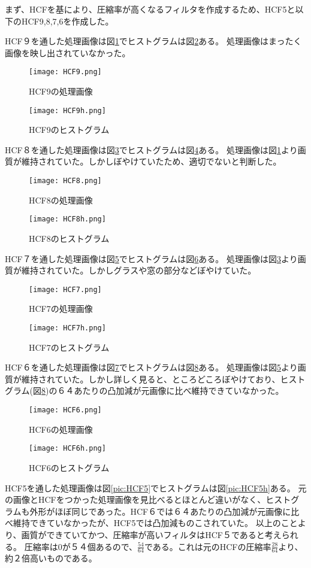 \documentclass[a4j]{jsarticle}
\begin{document}
まず、HCFを基により、圧縮率が高くなるフィルタを作成するため、HCF5と以下のHCF9,8,7,6を作成した。

HCF９を通した処理画像は図\ref{pic:HCF9}でヒストグラムは図\ref{pic:HCF9h}ある。
処理画像はまったく画像を映し出されていなかった。
\begin{figure}[H]
  \centering
  \texttt{[image: HCF9.png]}
  \caption{HCF9の処理画像}
  \label{pic:HCF9}
\end{figure}
\begin{figure}[H]
  \centering
  \texttt{[image: HCF9h.png]}
  \caption{HCF9のヒストグラム}
  \label{pic:HCF9h}
\end{figure}
HCF８を通した処理画像は図\ref{pic:HCF8}でヒストグラムは図\ref{pic:HCF8h}ある。
処理画像は図\ref{pic:HCF9}より画質が維持されていた。しかしぼやけていたため、適切でないと判断した。
\begin{figure}[H]
  \centering
  \texttt{[image: HCF8.png]}
  \caption{HCF8の処理画像}
  \label{pic:HCF8}
\end{figure}
\begin{figure}[H]
  \centering
  \texttt{[image: HCF8h.png]}
  \caption{HCF8のヒストグラム}
  \label{pic:HCF8h}
\end{figure}
HCF７を通した処理画像は図\ref{pic:HCF7}でヒストグラムは図\ref{pic:HCF7h}ある。
処理画像は図\ref{pic:HCF8}より画質が維持されていた。しかしグラスや窓の部分などぼやけていた。
\begin{figure}[H]
  \centering
  \texttt{[image: HCF7.png]}
  \caption{HCF7の処理画像}
  \label{pic:HCF7}
\end{figure}
\begin{figure}[H]
  \centering
  \texttt{[image: HCF7h.png]}
  \caption{HCF7のヒストグラム}
  \label{pic:HCF7h}
\end{figure}
HCF６を通した処理画像は図\ref{pic:HCF6}でヒストグラムは図\ref{pic:HCF6h}ある。
処理画像は図\ref{pic:HCF7}より画質が維持されていた。しかし詳しく見ると、ところどころぼやけており、ヒストグラム(図\ref{pic:HCF6h})の６４あたりの凸加減が元画像に比べ維持できていなかった。
\begin{figure}[H]
  \centering
  \texttt{[image: HCF6.png]}
  \caption{HCF6の処理画像}
  \label{pic:HCF6}
\end{figure}
\begin{figure}[H]
  \centering
  \texttt{[image: HCF6h.png]}
  \caption{HCF6のヒストグラム}
  \label{pic:HCF6h}
\end{figure}
HCF5を通した処理画像は図\ref{pic:HCF5}でヒストグラムは図\ref{pic:HCF5h}ある。
元の画像とHCFをつかった処理画像を見比べるとほとんど違いがなく、ヒストグラムも外形がほぼ同じであった。HCF６では６４あたりの凸加減が元画像に比べ維持できていなかったが、HCF5では凸加減ものこされていた。
以上のことより、画質ができていてかつ、圧縮率が高いフィルタはHCF５であると考えられる。
圧縮率は0が５４個あるので、$\frac{54}{64}$である。これは元のHCFの圧縮率$\frac{28}{64}$より、約２倍高いものである。
\end{document}
